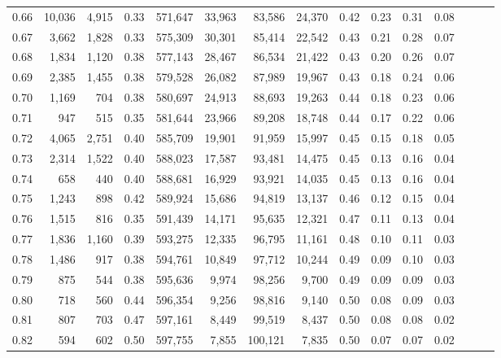 \begin{tabular}{rrrrrrrrrrrrrrr}
0.66 &  10,036 &  4,915 &  0.33 &  571,647 &   33,963 &   83,586 &   24,370 &  0.42 &  0.23 &  0.31 &      0.08 \\
0.67 &   3,662 &  1,828 &  0.33 &  575,309 &   30,301 &   85,414 &   22,542 &  0.43 &  0.21 &  0.28 &      0.07 \\
0.68 &   1,834 &  1,120 &  0.38 &  577,143 &   28,467 &   86,534 &   21,422 &  0.43 &  0.20 &  0.26 &      0.07 \\
0.69 &   2,385 &  1,455 &  0.38 &  579,528 &   26,082 &   87,989 &   19,967 &  0.43 &  0.18 &  0.24 &      0.06 \\
0.70 &   1,169 &    704 &  0.38 &  580,697 &   24,913 &   88,693 &   19,263 &  0.44 &  0.18 &  0.23 &      0.06 \\
0.71 &     947 &    515 &  0.35 &  581,644 &   23,966 &   89,208 &   18,748 &  0.44 &  0.17 &  0.22 &      0.06 \\
0.72 &   4,065 &  2,751 &  0.40 &  585,709 &   19,901 &   91,959 &   15,997 &  0.45 &  0.15 &  0.18 &      0.05 \\
0.73 &   2,314 &  1,522 &  0.40 &  588,023 &   17,587 &   93,481 &   14,475 &  0.45 &  0.13 &  0.16 &      0.04 \\
0.74 &     658 &    440 &  0.40 &  588,681 &   16,929 &   93,921 &   14,035 &  0.45 &  0.13 &  0.16 &      0.04 \\
0.75 &   1,243 &    898 &  0.42 &  589,924 &   15,686 &   94,819 &   13,137 &  0.46 &  0.12 &  0.15 &      0.04 \\
0.76 &   1,515 &    816 &  0.35 &  591,439 &   14,171 &   95,635 &   12,321 &  0.47 &  0.11 &  0.13 &      0.04 \\
0.77 &   1,836 &  1,160 &  0.39 &  593,275 &   12,335 &   96,795 &   11,161 &  0.48 &  0.10 &  0.11 &      0.03 \\
0.78 &   1,486 &    917 &  0.38 &  594,761 &   10,849 &   97,712 &   10,244 &  0.49 &  0.09 &  0.10 &      0.03 \\
0.79 &     875 &    544 &  0.38 &  595,636 &    9,974 &   98,256 &    9,700 &  0.49 &  0.09 &  0.09 &      0.03 \\
0.80 &     718 &    560 &  0.44 &  596,354 &    9,256 &   98,816 &    9,140 &  0.50 &  0.08 &  0.09 &      0.03 \\
0.81 &     807 &    703 &  0.47 &  597,161 &    8,449 &   99,519 &    8,437 &  0.50 &  0.08 &  0.08 &      0.02 \\
0.82 &     594 &    602 &  0.50 &  597,755 &    7,855 &  100,121 &    7,835 &  0.50 &  0.07 &  0.07 &      0.02 \\

\end{tabular}
